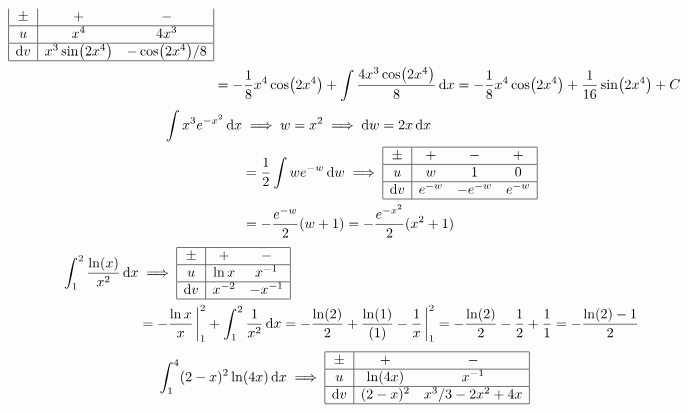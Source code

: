 \documentclass{article}
\begin{document}
\begin{tasks}[style = enumerate]
\begin{align*}
\begin{array}{|c|cc|}
									\pm & + & - \\\hline
									u & x^4 & 4x^3 \\\hline
									\dd{v} & x^3\sin(2x^4) & -\cos(2x^4)/8 \\\hline
								\end{array} \\
							&= -\frac{1}{8}x^4\cos(2x^4) + \int \frac{4x^3\cos(2x^4)}{8} \dd{x}
								= -\frac{1}{8}x^4\cos(2x^4) + \frac{1}{16}\sin(2x^4) + C
					\end{align*}
				\task
					\begin{align*}
						\int x^3 e^{-x^2} \dd{x} &\implies w = x^2
								\implies \dd{w} = 2x\dd{x}  \\
							&= \frac{1}{2}\int we^{-w} \dd{w}
								\implies
									\begin{array}{|c|ccc|}\hline
										\pm & + & - & + \\\hline
										u & w & 1 & 0 \\\hline
										\dd{v} & e^{-w} & -e^{-w} & e^{-w} \\\hline
									\end{array} \\
							&= -\frac{e^{-w}}{2}(w + 1)
								= -\frac{e^{-x^2}}{2}(x^2 + 1)
					\end{align*}
				\task
					\begin{align*}
						\int_1^2 \frac{\ln(x)}{x^2} \dd{x} &\implies
								\begin{array}{|c|cc|}\hline
									\pm & + & - \\\hline
									u & \ln x & x^{-1} \\\hline
									\dd{v} & x^{-2} & -x^{-1} \\\hline
								\end{array} \\
							&= -\frac{\ln x}{x} \eval_1^2 + \int_1^2 \frac{1}{x^2} \dd{x}
								= -\frac{\ln(2)}{2} + \frac{\ln(1)}{(1)} - \frac{1}{x} \eval_1^2
								= - \frac{\ln(2)}{2} - \frac{1}{2} + \frac{1}{1}
								= - \frac{\ln(2) - 1}{2}
					\end{align*}
				\task
					\begin{align*}
						\int_1^4 (2 - x)^2\ln(4x) \dd{x} &\implies
								\begin{array}{|c|cc|}\hline
									\pm & + & - \\\hline
									u & \ln(4x) & x^{-1} \\\hline
									\dd{v} & (2 - x)^2 & x^3/3 - 2x^2 + 4x\\\hline

\end{array}
\end{align*}
\end{tasks}
\end{document}
